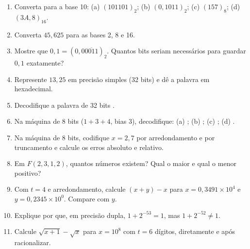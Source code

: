 \begin{enumerate}[label=\arabic*.]
  \item Converta para a base 10: (a) $(101101)_2$; (b) $(0{,}1011)_2$; (c) $(157)_8$; (d) $(3A{,}8)_{16}$.
  \item Converta $45{,}625$ para as bases 2, 8 e 16.
  \item Mostre que $0{,}1=(0{,}0\overline{0011})_2$. Quantos bits seriam necessários para guardar
        $0{,}1$ exatamente?
  \item Represente $13{,}25$ em precisão simples (32 bits) e dê a palavra em hexadecimal.
  \item Decodifique a palavra de 32 bits .
  \item Na máquina de 8 bits ($1+3+4$, bias 3), decodifique:
        (a) ; (b) ; (c) ; (d) .
  \item Na máquina de 8 bits, codifique $x=2{,}7$ por arredondamento e por truncamento e calcule os erros
        absoluto e relativo.
  \item Em $F(2,3,1,2)$, quantos números existem? Qual o maior e qual o menor positivo?
  \item Com $t=4$ e arredondamento, calcule $(x+y)-x$ para $x=0{,}3491\times10^{4}$ e $y=0{,}2345\times10^{0}$.
        Compare com $y$.
  \item Explique por que, em precisão dupla, $1+2^{-53}=1$, mas $1+2^{-52}\neq1$.
  \item Calcule $\sqrt{x+1}-\sqrt{x}$ para $x=10^8$ com $t=6$ dígitos, diretamente e após racionalizar.
\end{enumerate}

